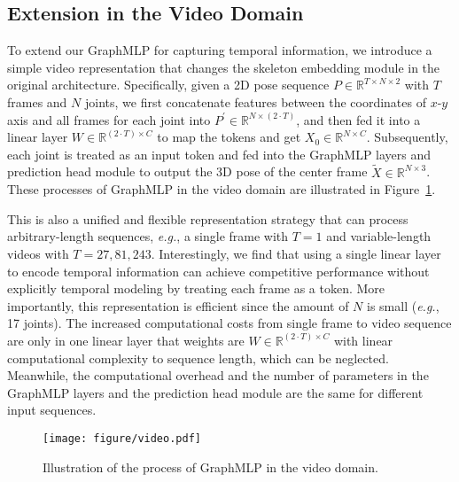 \documentclass[lettersize,journal]{IEEEtran}
\begin{document}
\subsection{Extension in the Video Domain}
To extend our GraphMLP for capturing temporal information, we introduce a simple video representation that changes the skeleton embedding module in the original architecture.  
Specifically, given a 2D pose sequence $P \in \mathbb{R}^{T \times N \times 2}$ with $T$ frames and $N$ joints, we first concatenate features between the coordinates of $x$-$y$ axis and all frames for each joint into $P^{\prime} \in \mathbb{R}^{N \times (2 \cdot T)}$, and then fed it into a linear layer $W \in \mathbb{R}^{(2 \cdot T) \times C}$ to map the tokens and get $X_{0} \in \mathbb{R}^{N \times C}$. 
Subsequently, each joint is treated as an input token and fed into the GraphMLP layers and prediction head module to output the 3D pose of the center frame $\widetilde{X} \in \mathbb{R}^{N \times 3}$. 
These processes of GraphMLP in the video domain are illustrated in Figure~\ref{fig:video}. 

This is also a unified and flexible representation strategy that can process arbitrary-length sequences, \emph{e.g.}, a single frame with $T=1$ and variable-length videos with $T=27,81,243$. 
Interestingly, we find that using a single linear layer to encode temporal information can achieve competitive performance without explicitly temporal modeling by treating each frame as a token. 
More importantly, this representation is efficient since the amount of $N$ is small (\emph{e.g.}, 17 joints). 
The increased computational costs from single frame to video sequence are only in one linear layer that weights are $W \in \mathbb{R}^{(2 \cdot T) \times C}$ with linear computational complexity to sequence length, which can be neglected. 
Meanwhile, the computational overhead and the number of parameters in the GraphMLP layers and the prediction head module are the same for different input sequences. 

\begin{figure}[tb]
\centering
\texttt{[image: figure/video.pdf]}
\caption
{
  Illustration of the process of GraphMLP in the video domain. 
}
\label{fig:video}
\end{figure}
\end{document}
